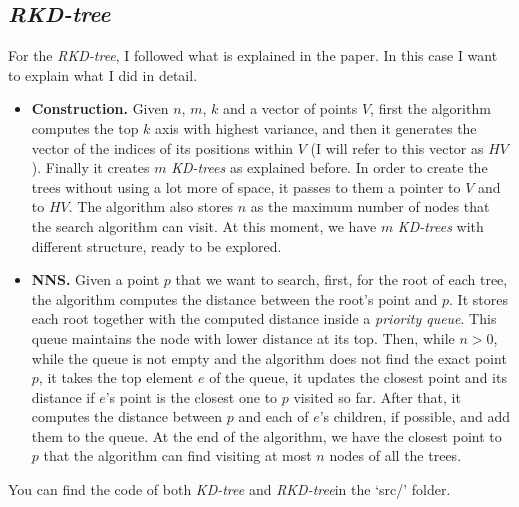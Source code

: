 \subsection{\textit{RKD-tree}}
For the \textit{RKD-tree}, I followed what is explained in the paper. In this case I want to explain what I did in detail.
\begin{itemize}
    \item \textbf{Construction.} Given $n$, $m$, $k$ and a vector of points $V$, first the algorithm computes the top $k$ axis with highest variance, and then it generates the vector of the indices of its positions within $V$ (I will refer to this vector as $HV$). Finally it creates $m$ \textit{KD-trees} as explained before. In order to create the trees without using a lot more of space, it passes to them a pointer to $V$ and to $HV$. The algorithm also stores $n$ as the maximum number of nodes that the search algorithm can visit. At this moment, we have $m$ \textit{KD-trees} with different structure, ready to be explored.
    \item \textbf{NNS.} Given a point $p$ that we want to search, first, for the root of each tree, the algorithm computes the distance between the root's point and $p$. It stores each root together with the computed distance inside a \textit{priority queue}. This queue maintains the node with lower distance at its top. Then, while $n > 0$, while the queue is not empty and the algorithm does not find the exact point $p$, it takes the top element $e$ of the queue, it updates the closest point and its distance if $e$'s point is the closest one to $p$ visited so far. After that, it computes the distance between $p$ and each of $e$'s children, if possible, and add them to the queue. At the end of the algorithm, we have the closest point to $p$ that the algorithm can find visiting at most $n$ nodes of all the trees.
\end{itemize}

You can find the code of both \textit{KD-tree} and \textit{RKD-tree}in the `src/' folder.